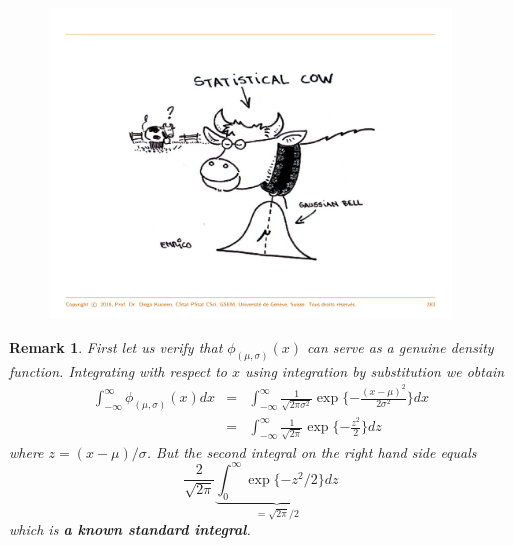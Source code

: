 \documentclass[notes=show,smaller]{beamer}\usepackage[]{graphicx}\usepackage[]{color}
\newtheorem{remark}{Remark}[section]
\begin{document}
\begin{frame}{\subsecname}
  \begin{figure}[ptb]\centering
  \includegraphics[width=0.95\textwidth,height=0.75\textheight]{img/Cow.pdf}%
  \end{figure}
\end{frame}

\begin{frame}{\subsecname}
\begin{remark}
  First let us verify that $\phi_{(\mu,\sigma)}(x)$ can serve as a
  genuine density function. Integrating with respect to $x$ using
  \textit{integration by substitution} we obtain
  \begin{eqnarray*}
  \int_{-\infty}^{\infty}\phi_{(\mu,\sigma)}(x)dx&=&
  \int_{-\infty}^{\infty}\frac{1}{\sqrt{2\pi\sigma^2}}\exp{\{-\frac{(x-\mu)^2}{2\sigma^2}\}}dx
  \\
   &=&\int_{-\infty}^{\infty}\frac{1}{\sqrt{2\pi}}\exp{\{-\frac{z^2}{2}\}}dz
  \end{eqnarray*}
  where $z=(x-\mu)/\sigma$. But the second integral on the right
  hand side equals
  $$
  \frac{2}{\sqrt{2\pi}}\underbrace{\int_0^{\infty}\exp{\{-z^2/2\}}dz}_{={\sqrt{2\pi}} \big/ {2}}
  $$
  which is \textbf{a known standard integral}.
\end{remark}
\end{frame}
\end{document}
